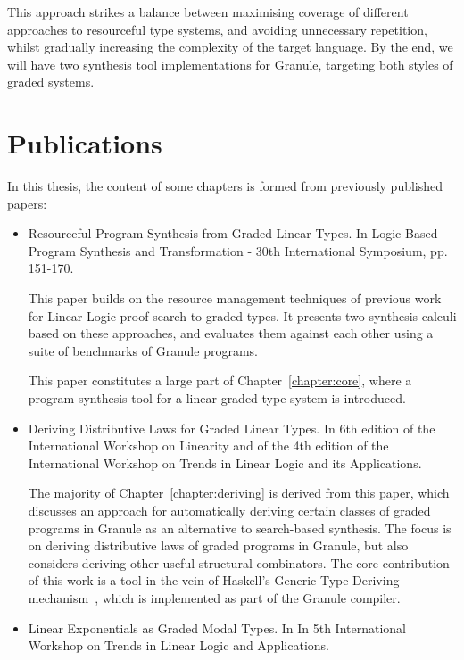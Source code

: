This approach strikes a balance between maximising coverage of different
approaches to resourceful type systems, and avoiding unnecessary repetition,
whilst gradually increasing the complexity of the target language. By the end, we
will have two synthesis tool implementations for Granule, targeting both
styles of graded systems.

\section{Publications}
In this thesis, the content of some chapters is formed from
previously published papers:
\begin{itemize}
    \item \citet{DBLP:conf/lopstr/HughesO20} Resourceful Program Synthesis from
    Graded Linear Types. In Logic-Based Program Synthesis and Transformation -
    30th International Symposium, pp. 151-170. 
    
    This paper builds on the resource management techniques of previous work for
    Linear Logic proof search to graded types. It presents two synthesis
    calculi based on these approaches, and evaluates them against each other 
    using a suite of benchmarks of Granule programs. 
    
    This paper constitutes a large part of Chapter~\ref{chapter:core}, where a
    program synthesis tool for a linear graded type system is introduced. 

    \item \citet{DBLP:journals/corr/abs-2112-14966} Deriving Distributive Laws
    for Graded Linear Types. In 6th edition of the International Workshop on
    Linearity and of the 4th edition of the International Workshop on Trends in
    Linear Logic and its Applications. 

    The majority of Chapter~\ref{chapter:deriving} is derived from this paper,
    which discusses an approach for automatically deriving certain classes of
    graded programs in Granule as an alternative to search-based synthesis. The
    focus is on deriving distributive laws of graded programs in Granule, but
    also considers deriving other useful structural combinators. The core
    contribution of this work is a tool in the vein of Haskell's Generic Type
    Deriving mechanism~\citep{generic-deriving}, which is implemented as part of
    the Granule compiler.

    \item \citet{hughes:lirmm-03271465} Linear Exponentials as Graded Modal
    Types. In In 5th International Workshop on Trends in Linear Logic and
    Applications.  


\end{itemize}
